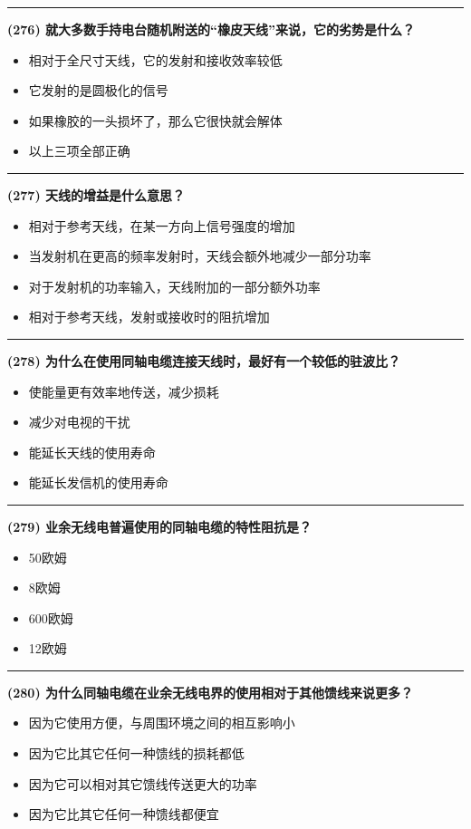 \documentclass[twocolumn]{ctexart}  %
\begin{document}
\noindent\rule{0.5\textwidth}{1pt}
\heiti \textbf{(276) 就大多数手持电台随机附送的“橡皮天线”来说，它的劣势是什么？} \songti {\color{gray} [LK1213] }
\begin{itemize}
	\item  相对于全尺寸天线，它的发射和接收效率较低
	\item  它发射的是圆极化的信号
	\item  如果橡胶的一头损坏了，那么它很快就会解体
	\item  以上三项全部正确
\end{itemize}


\noindent\rule{0.5\textwidth}{1pt}
\heiti \textbf{(277) 天线的增益是什么意思？} \songti {\color{gray} [LK1216] }
\begin{itemize}
	\item  相对于参考天线，在某一方向上信号强度的增加
	\item  当发射机在更高的频率发射时，天线会额外地减少一部分功率
	\item  对于发射机的功率输入，天线附加的一部分额外功率
	\item  相对于参考天线，发射或接收时的阻抗增加
\end{itemize}


\noindent\rule{0.5\textwidth}{1pt}
\heiti \textbf{(278) 为什么在使用同轴电缆连接天线时，最好有一个较低的驻波比？} \songti {\color{gray} [LK1217] }
\begin{itemize}
	\item  使能量更有效率地传送，减少损耗
	\item  减少对电视的干扰
	\item  能延长天线的使用寿命
	\item  能延长发信机的使用寿命
\end{itemize}


\noindent\rule{0.5\textwidth}{1pt}
\heiti \textbf{(279) 业余无线电普遍使用的同轴电缆的特性阻抗是？} \songti {\color{gray} [LK1218] }
\begin{itemize}
	\item  50欧姆
	\item  8欧姆
	\item  600欧姆
	\item  12欧姆
\end{itemize}


\noindent\rule{0.5\textwidth}{1pt}
\heiti \textbf{(280) 为什么同轴电缆在业余无线电界的使用相对于其他馈线来说更多？} \songti {\color{gray} [LK1219] }
\begin{itemize}
	\item  因为它使用方便，与周围环境之间的相互影响小
	\item  因为它比其它任何一种馈线的损耗都低
	\item  因为它可以相对其它馈线传送更大的功率
	\item  因为它比其它任何一种馈线都便宜
\end{itemize}
\end{document}
